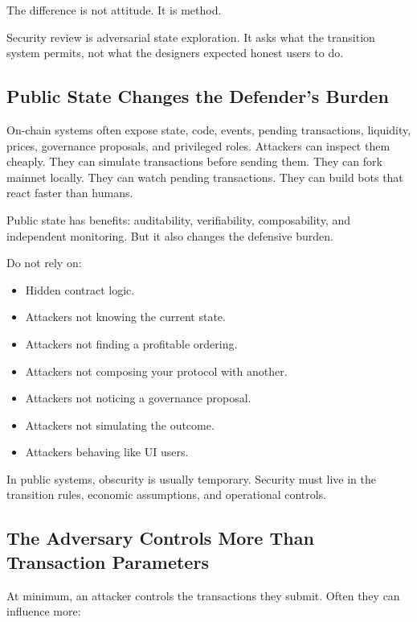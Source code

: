 The difference is not attitude. It is method.

Security review is adversarial state exploration. It asks what the
transition system permits, not what the designers expected honest users
to do.

\subsection{Public State Changes the Defender's Burden}

On-chain systems often expose state, code, events, pending transactions,
liquidity, prices, governance proposals, and privileged roles. Attackers
can inspect them cheaply. They can simulate transactions before sending
them. They can fork mainnet locally. They can watch pending
transactions. They can build bots that react faster than humans.

Public state has benefits: auditability, verifiability, composability,
and independent monitoring. But it also changes the defensive burden.

Do not rely on:

\begin{itemize}
\tightlist
\item
  Hidden contract logic.
\item
  Attackers not knowing the current state.
\item
  Attackers not finding a profitable ordering.
\item
  Attackers not composing your protocol with another.
\item
  Attackers not noticing a governance proposal.
\item
  Attackers not simulating the outcome.
\item
  Attackers behaving like UI users.
\end{itemize}

In public systems, obscurity is usually temporary. Security must live in
the transition rules, economic assumptions, and operational controls.

\subsection{The Adversary Controls More Than Transaction Parameters}

At minimum, an attacker controls the transactions they submit. Often
they can influence more:

